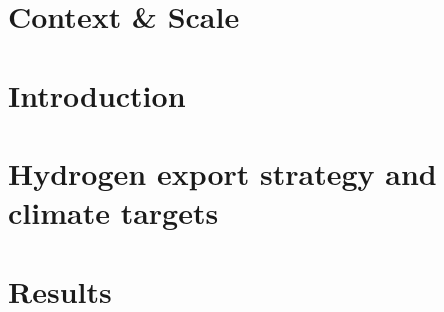 \documentclass[5p]{elsarticle}
\begin{document}






\section*{Context \& Scale}





\section*{Introduction}
\label{sec:intro}



\section*{Hydrogen export strategy and climate targets}
\label{sec:policyandtargets}





\section*{Results}
\label{sec:results}
\end{document}
